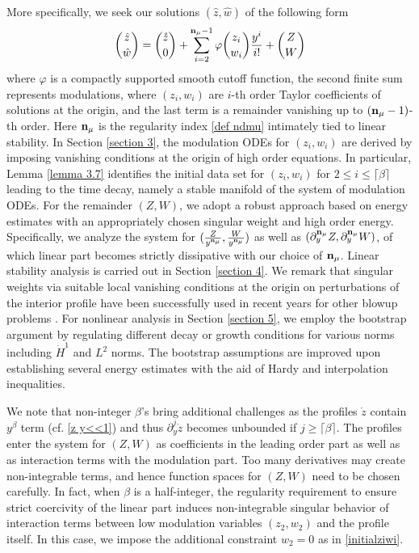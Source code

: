 \documentclass{article}
\newcommand{\pa}{\partial}
\def\ndmu{{\bf{n}_{\mu}}}
\numberwithin{equation}{section}
\begin{document}
More specifically, we seek our solutions $(\hat z, \hat w)$ of  the following form 
\[
\binom{\hat z}{\hat w} = \binom{\mathring z}{0} +  \sum_{i=2}^{\ndmu-1} \varphi  \binom{z_i}{w_i}\frac{y^i}{i ! } + \binom{Z}{W}
\]
where $\varphi$ is a compactly supported smooth cutoff function, the second finite sum  represents modulations, where $(z_i,w_i)$ are $i$-th order Taylor coefficients of solutions at the origin, and the last term is a remainder vanishing up to $(\ndmu-1)$-th order. Here $\ndmu$ is the regularity index  \eqref{def ndmu} intimately tied to linear stability. 
In Section \ref{section 3}, the modulation ODEs for $(z_i, w_i)$ are derived by imposing vanishing conditions at the origin of  high order equations. In particular,  Lemma \ref{lemma 3.7} identifies the initial data set for $(z_i, w_i)$ for $2\le i\le \lceil\beta\rceil$ leading to the time decay,  
namely a stable manifold of the system of modulation ODEs. For the remainder $(Z,W)$, we adopt a robust approach based on energy estimates with an appropriately chosen singular weight and high order energy. Specifically, we analyze the system for $(\frac{Z}{y^\ndmu},\frac{W}{y^\ndmu})$ as well as $(\pa_y^\ndmu Z, \pa_y^\ndmu W)$, of which linear part becomes strictly dissipative with our choice of $\ndmu$. Linear stability analysis is carried out in Section \ref{section 4}. We remark that %
singular weights via suitable local vanishing conditions at the origin on perturbations of the interior profile have been successfully used  in recent years for other blowup problems \cite{chenHou22, hou20242, chenHouhuang21, LWZ25}. 
For nonlinear analysis in Section \ref{section 5}, we employ the bootstrap argument by regulating different decay or growth conditions for various norms including $\dot H^1$ and $L^2$ norms. The bootstrap assumptions are improved upon establishing several energy estimates with the aid of Hardy and interpolation inequalities. 

We note that non-integer $\beta$'s bring additional challenges as the profiles $\mathring z $ contain $y^\beta$ term (cf. \eqref{z y<<1}) and thus $\pa_y^j \mathring z$ becomes unbounded if $j \ge \lceil \beta\rceil$. The profiles enter the system for $(Z,W)$ as coefficients in the leading order part as well as as interaction terms with the modulation part. Too many derivatives may create non-integrable terms, and hence function spaces for $(Z,W)$ need to be chosen carefully. In fact, when  $\beta$ is a half-integer, the regularity requirement  to ensure strict coercivity of the linear part  induces non-integrable
singular behavior of interaction terms between low modulation variables $(z_2,w_2)$ and the profile itself. In this case, we impose the additional constraint $w_2=0$ as in \eqref{initialziwi}.        
\end{document}
